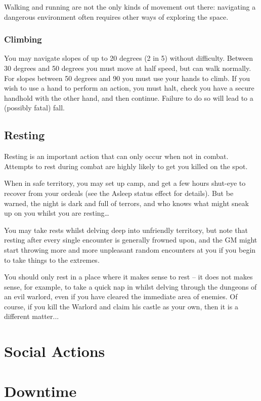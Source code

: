 Walking and running are not the only kinds of movement out there: navigating a dangerous environment often requires other ways of exploring the space. 

\subsubsection{Climbing}

You may navigate slopes of up to 20 degrees (2 in 5) without difficulty. Between 30 degrees and 50 degrees you must move at half speed, but can walk normally. For slopes between 50 degrees and 90 you must use your hands to climb. If you wish to use a hand to perform an action, you must halt, check you have a secure handhold with the other hand, and then continue. Failure to do so will lead to a (possibly fatal) fall.


\subsection{Resting}

Resting is an important action that can only occur when not in combat. Attempts to rest during combat are highly likely to get you killed on the spot. 

When in safe territory, you may set up camp, and get a few hours shut-eye to recover from your ordeals (see the Asleep status effect for details). But be warned, the night is dark and full of terrors, and who knows what might sneak up on you whilst you are resting…

You may take rests whilst delving deep into unfriendly territory, but note that resting after every single encounter is generally frowned upon, and the GM might start throwing more and more unpleasant random encounters at you if you begin to take things to the extremes. 

You should only rest in a place where it makes sense to rest – it does not makes sense, for example, to take a quick nap in whilst delving through the dungeons of an evil warlord, even if you have cleared the immediate area of enemies. Of course, if you kill the Warlord and claim his castle as your own, then it is a different matter...

\section{Social Actions}

\section{Downtime}